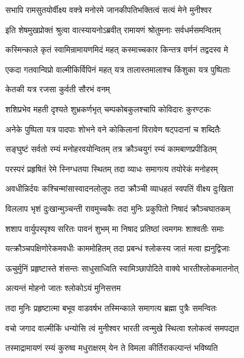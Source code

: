 \twolineshloka
{सभापि रामसुतयोर्वीक्ष्य वक्त्रे मनोरमे}
{जानकीपतिभक्तित्वं सत्यं मेने मुनीश्वर}%

\twolineshloka
{इति शेषमुखप्रोक्तं श्रुत्वा वात्स्यायनोऽब्रवीत्}
{रामायणं श्रोतुमनाः सर्वधर्मसमन्वितम्}%


\twolineshloka
{कस्मिन्काले कृतं स्वामिन्रामायणमिदं महत्}
{कस्माच्चकार किन्तत्र वर्णनं तद्वदस्व मे}%


\twolineshloka
{एकदा गतवान्विप्रो वाल्मीकिर्विपिनं महत्}
{यत्र तालास्तमालाश्च किंशुका यत्र पुष्पिताः}%

केतकी यत्र रजसा कुर्वती सौरभं वनम्

\twolineshloka
{शशिप्रभेव महती दृश्यते शुभ्रकर्णभृत्}
{चम्पकोबकुलश्चापि कोविदारः कुरण्टकः}%

\twolineshloka
{अनेके पुष्पिता यत्र पादपाः शोभने वने}
{कोकिलानां विरावेण षट्पदानां च शब्दितैः}%

\twolineshloka
{सङ्घुष्टं सर्वतो रम्यं मनोहरवयोन्वितम्}
{तत्र क्रौञ्चयुगं रम्यं कामबाणप्रपीडितम्}%

\twolineshloka
{परस्परं प्रहृषितं रेमे स्निग्धतया स्थितम्}
{तदा व्याधः समागत्य तयोरेकं मनोहरम्}%

\twolineshloka
{अवधीन्निर्दयः कश्चिन्मांसास्वादनलोलुपः}
{तदा क्रौञ्ची व्याधहतं स्वपतिं वीक्ष्य दुःखिता}%

\twolineshloka
{विललाप भृशं दुःखान्मुञ्चन्ती रावमुच्चकैः}
{तदा मुनिः प्रकुपितो निषादं क्रौञ्चघातकम्}%

\twolineshloka
{शशाप वार्युपस्पृश्य सरितः पावनं शुभम्}
{मा निषाद प्रतिष्ठां त्वमगमः शाश्वतीः समाः}%

\twolineshloka
{यत्क्रौञ्चपक्षिणोरेकमवधीः काममोहितम्}
{तदा प्रबन्धं श्लोकस्य जातं मत्वा ह्यनुद्विजाः}%

\twolineshloka
{ऊचुर्मुनिं प्रहृष्टास्ते शंसन्तः साधुसाध्विति}
{स्वामिञ्छापोदिते वाक्ये भारतीश्लोकमातनोत्}%

अत्यन्तं मोहनो जातः श्लोकोऽयं मुनिसत्तम

\twolineshloka
{तदा मुनिः प्रहृष्टात्मा बभूव वाडवर्षभ}
{तस्मिन्काले समागत्य ब्रह्मा पुत्रैः समन्वितः}%

\twolineshloka
{वचो जगाद वाल्मीकिं धन्योसि त्वं मुनीश्वर}
{भारती त्वन्मुखे स्थित्वा श्लोकत्वं समपद्यत}%

\twolineshloka
{तस्माद्रामायणं रम्यं कुरुष्व मधुराक्षरम्}
{येन ते विमला कीर्तिराकल्पान्तं भविष्यति}%

